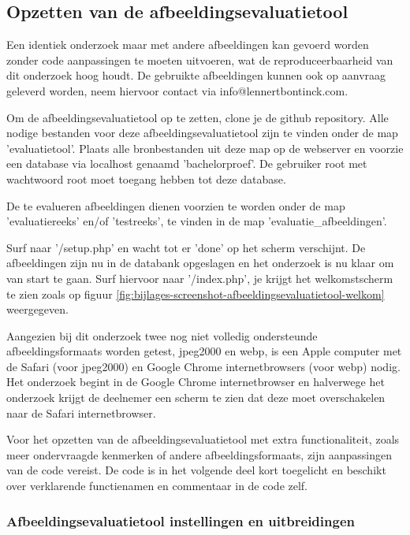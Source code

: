 \subsection{Opzetten van de afbeeldingsevaluatietool}
\label{sec:onderzoek-evaluatietool-setup}

Een identiek onderzoek maar met andere afbeeldingen kan gevoerd worden zonder code aanpassingen te moeten uitvoeren, wat de reproduceerbaarheid van dit onderzoek hoog houdt. De gebruikte afbeeldingen kunnen ook op aanvraag geleverd worden, neem hiervoor contact via info@lennertbontinck.com.

Om de \gls{afbeeldingsevaluatietool} op te zetten, clone je de \gls{github} repository. Alle nodige bestanden voor deze \gls{afbeeldingsevaluatietool} zijn te vinden onder de map 'evaluatietool'. Plaats alle bronbestanden uit deze map op de webserver en voorzie een database via localhost genaamd 'bachelorproef'. De gebruiker root met wachtwoord root moet toegang hebben tot deze database. 

De te evalueren afbeeldingen dienen voorzien te worden onder de map 'evaluatiereeks' en/of 'testreeks', te vinden in de map 'evaluatie\_afbeeldingen'.

Surf naar '/setup.php' en wacht tot er 'done' op het scherm verschijnt. De afbeeldingen zijn nu in de databank opgeslagen en het onderzoek is nu klaar om van start te gaan. Surf hiervoor naar '/index.php', je krijgt het welkomstscherm te zien zoals op figuur \ref{fig:bijlages-screenshot-afbeeldingsevaluatietool-welkom} weergegeven.

Aangezien bij dit onderzoek twee nog niet volledig ondersteunde \glspl{afbeeldingsformaat} worden getest, \gls{jpeg2000} en \gls{webp}, is een Apple computer met de Safari (voor \gls{jpeg2000}) en Google Chrome internetbrowsers (voor \gls{webp}) nodig. Het onderzoek begint in de Google Chrome internetbrowser en halverwege het onderzoek krijgt de deelnemer een scherm te zien dat deze moet overschakelen naar de Safari internetbrowser.

Voor het opzetten van de \gls{afbeeldingsevaluatietool} met extra functionaliteit, zoals meer ondervraagde kenmerken of andere \glspl{afbeeldingsformaat}, zijn aanpassingen van de code vereist. De code is in het volgende deel kort toegelicht en beschikt over verklarende functienamen en commentaar in de code zelf. 

\subsubsection{Afbeeldingsevaluatietool instellingen en uitbreidingen}
\label{sec:onderzoek-evaluatietool-setup-database}

